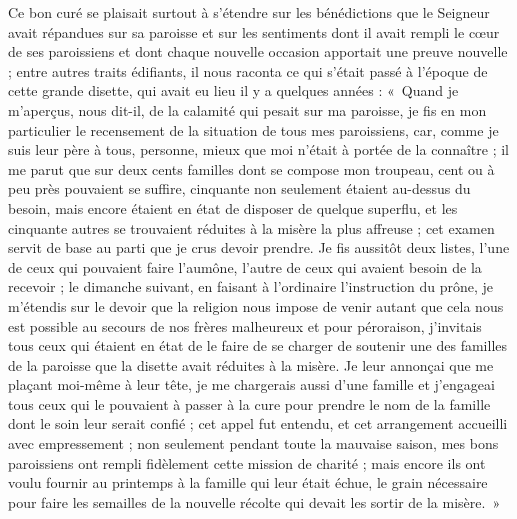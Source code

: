 \documentclass[11pt,a4paper]{report}
\begin{document}
Ce bon curé se plaisait surtout à s'étendre sur les bénédictions que le Seigneur avait répandues sur sa paroisse et sur les sentiments dont il avait rempli le cœur de ses paroissiens et dont chaque nouvelle occasion apportait une preuve nouvelle ; entre autres traits édifiants, il nous raconta ce qui s'était passé à l'époque de cette grande disette, qui avait eu lieu il y a quelques années : «~Quand je m'aperçus, nous dit-il, de la calamité qui pesait sur ma paroisse, je fis en mon particulier le recensement de la situation de tous mes paroissiens, car, comme je suis leur père à tous, personne, mieux que moi n'était à portée de la connaître ; il me parut que sur deux cents familles dont se compose mon troupeau, cent ou à peu près pouvaient se suffire, cinquante non seulement étaient au-dessus du besoin, mais encore étaient en état de disposer de quelque superflu, et les cinquante autres se trouvaient réduites à la misère la plus affreuse ; cet examen servit de base au parti que je crus devoir prendre. Je fis aussitôt deux listes, l'une de ceux qui pouvaient faire l'aumône, l'autre de ceux qui avaient besoin de la recevoir ; le dimanche suivant, en faisant à l'ordinaire l'instruction du prône, je m'étendis sur le devoir que la religion nous impose de venir autant que cela nous est possible au secours de nos frères malheureux et pour péroraison, j'invitais tous ceux qui étaient en état de le faire de se charger de soutenir une des familles de la paroisse que la disette avait réduites à la misère. Je leur annonçai que me plaçant moi-même à leur tête, je me chargerais aussi d'une famille et j'engageai tous ceux qui le pouvaient à passer à la cure pour prendre le nom de la famille dont le soin leur serait confié ; cet appel fut entendu, et cet arrangement accueilli avec empressement ; non seulement pendant toute la mauvaise saison, mes bons paroissiens ont rempli fidèlement cette mission de charité ; mais encore ils ont voulu fournir au printemps à la famille qui leur était échue, le grain nécessaire pour faire les semailles de la nouvelle récolte qui devait les sortir de la misère.~»
\end{document}
